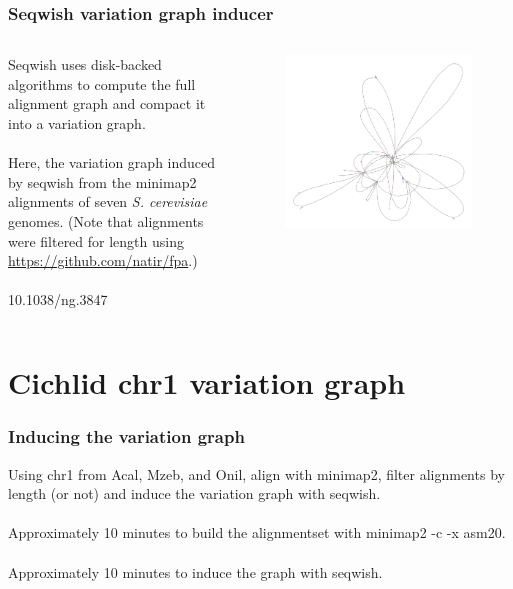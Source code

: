 \documentclass[aspectratio=169]{beamer}
\begin{document}
\begin{frame}
  \frametitle{Seqwish variation graph inducer}
  \begin{columns}[c] %

    Seqwish uses disk-backed algorithms to compute the full alignment graph and compact it into a variation graph.
    \\~\\
    Here, the variation graph induced by seqwish from the  minimap2 alignments of seven \emph{S. cerevisiae} genomes.
    (Note that alignments were filtered for length using \url{https://github.com/natir/fpa}.)
    \\~\\
    10.1038/ng.3847

    \begin{figure}
      \includegraphics[scale=0.145,center]{seqwish_yeast.png}
    \end{figure}
  \end{columns}
\end{frame}

\section{Cichlid chr1 variation graph}
\begin{frame}
  \frametitle{Inducing the variation graph}
  Using chr1 from Acal, Mzeb, and Onil, align with minimap2, filter alignments by length (or not) and induce the variation graph with seqwish.
  \\~\\
  Approximately 10 minutes to build the alignmentset with minimap2 -c -x asm20.
  \\~\\
  Approximately 10 minutes to induce the graph with seqwish.
\end{frame}
\end{document}
